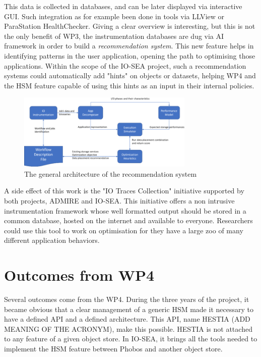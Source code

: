 This data is collected in databases, and can be later displayed via interactive 
GUI. Such integration as for example been done in tools via LLView or ParaStation HealthChecker. Giving a clear
overview is interesting, but this is not the only benefit of WP3, the instrumentation databases are dug via 
AI framework in order to build a \textit{recommendation system}. This new feature helps in identifying patterns
in the user application, opening the path to optimising those applications. Within the scope of the IO-SEA
project, such a recommendation systems could automatically add "hints" on objects or datasets, helping WP4 and
the HSM feature capable of using this hints as an input in their internal policies.

\begin{figure}[H]
    \centering
    \includegraphics[width=0.75\textwidth]{FIGS/recom.png}
    \caption[Recommendation system]{ The general architecture of the recommendation system}
    \label{fig:recom}
\end{figure}

A side effect of this work is the "IO Traces Collection" initiative supported by both projects, ADMIRE and
IO-SEA. This initiative offers a non intrusive instrumentation framework whose well formatted output should be
stored in a common database, hosted on the internet and available to everyone. Researchers could use this tool
to work on optimisation for they have a large zoo of many different application behaviors. 





\section{Outcomes from WP4}

Several outcomes come from the WP4. During the three years of the project, it became obvious that a clear 
management of a generic HSM made it necessary to have a defined API and a defined architecture. This API, name HESTIA (ADD MEANING OF THE ACRONYM), make this possible. HESTIA is not attached to any feature of a given object 
store. In IO-SEA, it brings all the tools needed to implement the HSM feature between Phobos and another object
store.

